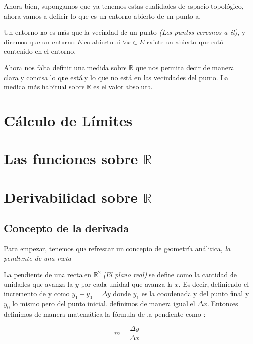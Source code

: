 Ahora bien, supongamos que ya tenemos estas cualidades de espacio topológico, ahora vamos a definir lo que es un entorno abierto de un punto a. 
\begin{defi}
Un entorno no es más que la vecindad de un punto \emph{(Los puntos cercanos a él)}, y diremos que un entorno $E$ es abierto si $\forall x \in E $ existe un abierto que está contenido en el entorno. 

\end{defi}

Ahora nos falta definir una medida sobre $\mathbb{R}$ que nos permita decir de manera clara y concisa lo que está y lo que no está en las vecindades del punto. La medida más habitual sobre $\mathbb{R}$ es el valor absoluto. 





\chapter{Cálculo de Límites}
\minitoc

\newpage
\chapter{Las funciones sobre $\mathbb{R}$}
\minitoc

\newpage
\chapter{Derivabilidad sobre $\mathbb{R}$}

\minitoc


\newpage

\section{Concepto de la derivada}
Para empezar, tenemos que refrescar un concepto de geometría análitica, \emph{la pendiente de una recta}
\begin{defi}
La pendiente de una recta en $\mathbb{R}^2$ \emph{(El plano real)} se define como la cantidad de unidades que avanza la $y$ por cada unidad que avanza la $x$. Es decir, definiendo el incremento de y como $y_1-y_0=\Delta y$ donde $y_1$ es la coordenada y del punto final y $y_0$ lo mismo pero del punto inicial. definimos de manera igual el $\Delta x$. Entonces definimos de manera matemática la fórmula de la pendiente como :
\end{defi}
\begin{equation*}
m=\dfrac{\Delta y}{\Delta x}
\end{equation*}

